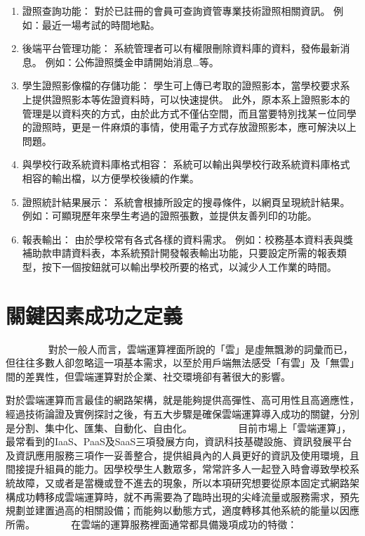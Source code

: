 \begin{enumerate}[noitemsep]
\item 證照查詢功能：
對於已註冊的會員可查詢資管專業技術證照相關資訊。
例如：最近一場考試的時間地點。

\item 後端平台管理功能：
系統管理者可以有權限刪除資料庫的資料，發佈最新消息。
例如：公佈證照獎金申請開始消息…等。

\item 學生證照影像檔的存儲功能：
學生可上傳已考取的證照影本，當學校要求系上提供證照影本等佐證資料時，可以快速提供。
此外，原本系上證照影本的管理是以資料夾的方式，由於此方式不僅佔空間，而且當要特別找某ㄧ位同學的證照時，更是ㄧ件麻煩的事情，使用電子方式存放證照影本，應可解決以上問題。

\item 與學校行政系統資料庫格式相容：
系統可以輸出與學校行政系統資料庫格式相容的輸出檔，以方便學校後續的作業。

\item 證照統計結果展示：
系統會根據所設定的搜尋條件，以網頁呈現統計結果。
例如：可顯現歷年來學生考過的證照張數，並提供友善列印的功能。

\item 報表輸出：
由於學校常有各式各樣的資料需求。
例如：校務基本資料表與獎補助款申請資料表，本系統預計開發報表輸出功能，只要設定所需的報表類型，按下一個按鈕就可以輸出學校所要的格式，以減少人工作業的時間。
\end{enumerate}

  \section{關鍵因素成功之定義}
　　　　
對於一般人而言，雲端運算裡面所說的「雲」是虛無飄渺的詞彙而已，但往往多數人卻忽略這一項基本需求，以至於用戶端無法感受「有雲」及「無雲」間的差異性，但雲端運算對於企業、社交環境卻有著很大的影響。

對於雲端運算而言最佳的網路架構，就是能夠提供高彈性、高可用性且高適應性，經過技術論證及實例探討之後，有五大步驟是確保雲端運算導入成功的關鍵，分別是分割、集中化、匯集、自動化、自由化。 
　　　　 
目前市場上「雲端運算」，最常看到的IaaS、PaaS及SaaS三項發展方向，資訊科技基礎設施、資訊發展平台及資訊應用服務三項作一妥善整合，提供組員內的人員更好的資訊及使用環境，且間接提升組員的能力。因學校學生人數眾多，常常許多人一起登入時會導致學校系統故障，又或者是當機或登不進去的現象，所以本項研究想要從原本固定式網路架構成功轉移成雲端運算時，就不再需要為了臨時出現的尖峰流量或服務需求，預先規劃並建置過高的相關設備；而能夠以動態方式，適度轉移其他系統的能量以因應所需。
　　　
在雲端的運算服務裡面通常都具備幾項成功的特徵：


